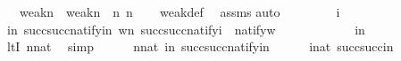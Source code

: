 \begin{isabellebody}
\ \ \ {\isachardoublequoteopen}weak{\isacharparenleft}{\kern0pt}n{\isacharcomma}{\kern0pt}{}{\isacharparenright}{\kern0pt}\ {\isacharminus}{\kern0pt}\ weak{\isacharparenleft}{\kern0pt}n{\isacharcomma}{\kern0pt}{}{\isacharparenright}{\kern0pt}\ {\isasymsubseteq}\ {\isacharbraceleft}{\kern0pt}{}{\isacharhash}{\kern0pt}{\isacharplus}{\kern0pt}n{\isacharcomma}{\kern0pt}\ {}{\isacharhash}{\kern0pt}{\isacharplus}{\kern0pt}n{\isacharbraceright}{\kern0pt}{\isachardoublequoteclose}\isanewline
%
\isadelimproof
\ \ %
\endisadelimproof
%
\isatagproof
{}\isamarkupfalse%
\ weak{\isacharunderscore}{\kern0pt}def\ \isamarkupfalse%
\ assms\isanewline
{}\isamarkupfalse%
{\isacharparenleft}{\kern0pt}auto{\isacharparenright}{\kern0pt}\isanewline
\ \ \isacommand{{\isacharbraceleft}{\kern0pt}}\isamarkupfalse%
\isanewline
\ \ \ \ \isamarkupfalse%
\ i\isanewline
\ \ \ \ \isamarkupfalse%
\ {\isachardoublequoteopen}i{\isasymin}n{\isachardoublequoteclose}\ {\isachardoublequoteopen}succ{\isacharparenleft}{\kern0pt}succ{\isacharparenleft}{\kern0pt}natify{\isacharparenleft}{\kern0pt}i{\isacharparenright}{\kern0pt}{\isacharparenright}{\kern0pt}{\isacharparenright}{\kern0pt}{\isasymnoteq}n{\isachardoublequoteclose}\ {\isachardoublequoteopen}{\isasymforall}w{\isasymin}n{\isachardot}{\kern0pt}\ succ{\isacharparenleft}{\kern0pt}succ{\isacharparenleft}{\kern0pt}natify{\isacharparenleft}{\kern0pt}i{\isacharparenright}{\kern0pt}{\isacharparenright}{\kern0pt}{\isacharparenright}{\kern0pt}\ {\isasymnoteq}\ natify{\isacharparenleft}{\kern0pt}w{\isacharparenright}{\kern0pt}{\isachardoublequoteclose}\isanewline
\ \ \ \ \isamarkupfalse%
\ \isanewline
\ \ \ \ \isamarkupfalse%
\ {\isachardoublequoteopen}i{\isacharless}{\kern0pt}n{\isachardoublequoteclose}\ \isanewline
\ \ \ \ \ \ \isamarkupfalse%
\ ltI\ {\isacartoucheopen}n{\isasymin}nat{\isacartoucheclose}\ \isamarkupfalse%
\ simp\isanewline
\ \ \ \ \isamarkupfalse%
\ {\isacartoucheopen}n{\isasymin}nat{\isacartoucheclose}\ {\isacartoucheopen}i{\isasymin}n{\isacartoucheclose}\ {\isacartoucheopen}succ{\isacharparenleft}{\kern0pt}succ{\isacharparenleft}{\kern0pt}natify{\isacharparenleft}{\kern0pt}i{\isacharparenright}{\kern0pt}{\isacharparenright}{\kern0pt}{\isacharparenright}{\kern0pt}{\isasymnoteq}n{\isacartoucheclose}\isanewline
\ \ \ \ \isamarkupfalse%
\ {\isachardoublequoteopen}i{\isasymin}nat{\isachardoublequoteclose}\ {\isachardoublequoteopen}succ{\isacharparenleft}{\kern0pt}succ{\isacharparenleft}{\kern0pt}i{\isacharparenright}{\kern0pt}{\isacharparenright}{\kern0pt}{\isasymnoteq}n{\isachardoublequoteclose}\ \isamarkupfalse%

\end{isabellebody}
